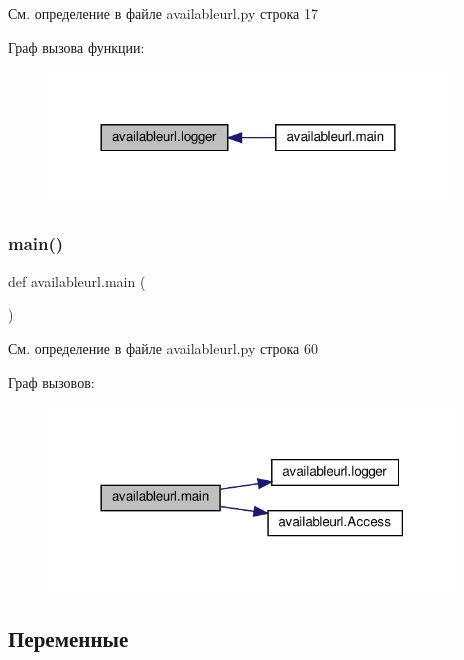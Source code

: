 См. определение в файле availableurl.\+py строка 17

Граф вызова функции\+:\nopagebreak
\begin{figure}[H]
\begin{center}
\leavevmode
\includegraphics[width=300pt]{namespaceavailableurl_a25d6c72ce2cd54a5490720f1319c68dc_icgraph}
\end{center}
\end{figure}
\mbox{\label{namespaceavailableurl_a9bdd46562a5ef06276fceee5109958e7}} 
\subsubsection{\texorpdfstring{main()}{main()}}
{\footnotesize\ttfamily def availableurl.\+main (\begin{DoxyParamCaption}{ }\end{DoxyParamCaption})}



См. определение в файле availableurl.\+py строка 60

Граф вызовов\+:\nopagebreak
\begin{figure}[H]
\begin{center}
\leavevmode
\includegraphics[width=306pt]{namespaceavailableurl_a9bdd46562a5ef06276fceee5109958e7_cgraph}
\end{center}
\end{figure}


\subsection{Переменные}
\mbox{\label{namespaceavailableurl_a37fb41a94b1d571e29110ace71a6779b}} 
